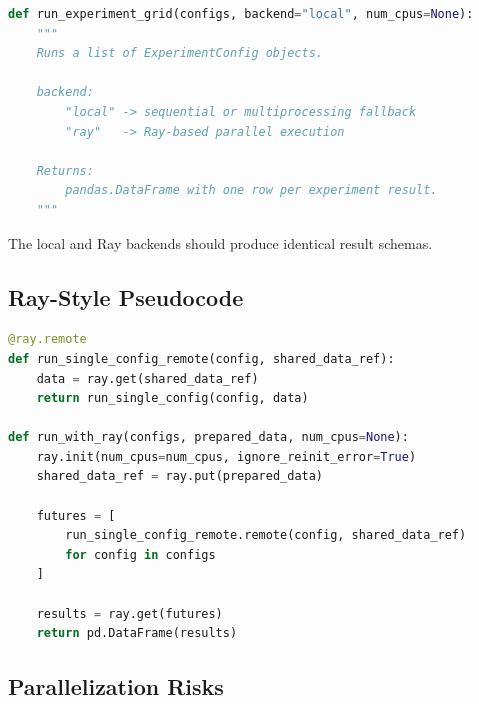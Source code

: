 \documentclass[11pt]{article}
\begin{document}
\begin{lstlisting}[language=Python]
def run_experiment_grid(configs, backend="local", num_cpus=None):
    """
    Runs a list of ExperimentConfig objects.

    backend:
        "local" -> sequential or multiprocessing fallback
        "ray"   -> Ray-based parallel execution

    Returns:
        pandas.DataFrame with one row per experiment result.
    """
\end{lstlisting}

The local and Ray backends should produce identical result schemas.

\subsection{Ray-Style Pseudocode}

\begin{lstlisting}[language=Python]
@ray.remote
def run_single_config_remote(config, shared_data_ref):
    data = ray.get(shared_data_ref)
    return run_single_config(config, data)

def run_with_ray(configs, prepared_data, num_cpus=None):
    ray.init(num_cpus=num_cpus, ignore_reinit_error=True)
    shared_data_ref = ray.put(prepared_data)

    futures = [
        run_single_config_remote.remote(config, shared_data_ref)
        for config in configs
    ]

    results = ray.get(futures)
    return pd.DataFrame(results)
\end{lstlisting}

\subsection{Parallelization Risks}
\end{document}
